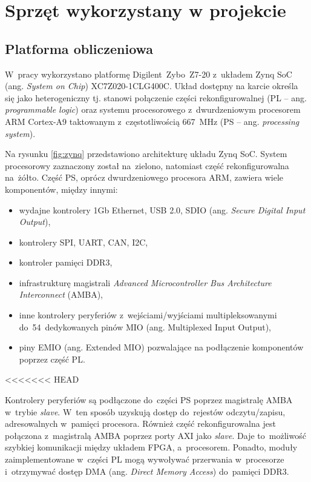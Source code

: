 \chapter{Sprzęt wykorzystany w projekcie}
\label{cha:Zybo_PCAM_dron}


\section{Platforma obliczeniowa}
\label{sec:platforma_obliczeniowa}

W~pracy wykorzystano platformę Digilent~Zybo~Z7-20 z~układem Zynq SoC (ang. \textit{System on Chip}) XC7Z020-1CLG400C. 
Układ dostępny na karcie określa się jako heterogeniczny tj. stanowi połączenie części rekonfigurowalnej (PL -- ang. \textit{programmable logic}) oraz systemu procesorowego z~dwurdzeniowym procesorem ARM Cortex-A9 taktowanym z~częstotliwością 667~MHz (PS -- ang. \textit{processing system}).

Na rysunku \ref{fig:zynq} przedstawiono architekturę układu Zynq SoC. 
System procesorowy zaznaczony został na~zielono, natomiast część rekonfigurowalna na~żółto. 
Część PS, oprócz dwurdzeniowego procesora ARM, zawiera wiele komponentów, między innymi:
\begin{itemize}
	\item wydajne kontrolery 1Gb Ethernet, USB 2.0, SDIO (ang. \textit{Secure Digital Input Output}),
	\item kontrolery SPI, UART, CAN, I2C,
	\item kontroler pamięci DDR3,
	\item infrastrukturę magistrali \textit{Advanced Microcontroller Bus Architecture Interconnect} (AMBA),
	\item inne kontrolery peryferiów z~wejściami/wyjściami multipleksowanymi do~54~dedykowanych pinów MIO (ang. Multiplexed Input Output),
	\item piny EMIO (ang. Extended MIO) pozwalające na podłączenie komponentów poprzez część PL.
\end{itemize}
<<<<<<< HEAD

Kontrolery peryferiów są podłączone do~części PS poprzez magistralę AMBA w~trybie \textit{slave}. 
W~ten sposób uzyskują dostęp do~rejestów odczytu/zapisu, adresowalnych w~pamięci procesora. 
Również część rekonfigurowalna jest połączona z~magistralą AMBA poprzez porty AXI jako \textit{slave}. 
Daje to~możliwość szybkiej komunikacji między układem FPGA, a~procesorem. 
Ponadto, moduły zaimplementowane w~części PL mogą wywoływać przerwania w~procesorze i~otrzymywać dostęp DMA (ang. \textit{Direct Memory Access}) do~pamięci DDR3.


